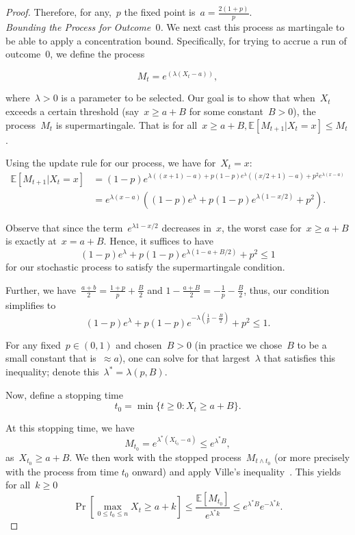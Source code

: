 \begin{proof}
Therefore, for any,~$p$ the fixed point is~$a = \frac{2(1+p)}{p}$.\\

\textit{Bounding the Process for Outcome~$0$.} 
We next cast this process as martingale to be able to apply a concentration bound. Specifically, for trying to accrue a run of outcome~$0$, we define the process

$$M_t = e^{(\lambda(X_t - a))},$$

where~$\lambda > 0$ is a parameter to be selected. Our goal is to show that when~$X_t$ exceeds a certain threshold (say~$x \geq a + B$ for some constant~$B > 0$), the process~$M_t$ is supermartingale. That is for all~$x \geq a + B, \mathbb{E}[M_{t+1} | X_t = x] \leq M_t$. 

Using the update rule for our process, we have for~$X_t = x$:
\begin{align*}
    \mathbb{E}[M_{t+1} | X_t = x] &= (1-p)e^{\lambda((x+1)-a) + p(1-p)e^{\lambda}((x/2+1)-a) + p^2e^{\lambda(x-a)}} \\
    &= e^{\lambda(x-a)} \left( (1-p)e^{\lambda} + p(1-p)e^{\lambda(1-x/2)}+p^2 \right).
\end{align*}

Observe that since the term~$e^{\lambda1-x/2}$ decreases in~$x$, the worst case for~$x \geq a+B$ is exactly at~$x=a+B$. Hence, it suffices to have
$$(1-p)e^{\lambda} + p(1-p)e^{\lambda(1-a+B/2)}+p^2 \leq 1$$
for our stochastic process to satisfy the supermartingale condition. 

Further, we have~$\frac{a+b}{2} = \frac{1+p}{p} + \frac{B}{2}$ and $1 - \frac{a+B}{2} = -\frac{1}{p} - \frac{B}{2}$, thus, our condition simplifies to
$$(1-p)e^{\lambda} + p(1-p)e^{-\lambda \left( \frac{1}{p} - \frac{B}{2} \right)} + p^2 \leq 1.$$

For any fixed~$p \in (0,1)$ and chosen~$B>0$ (in practice we chose~$B$ to be a small constant that is~$\approx a$), one can solve for that largest~$\lambda$ that satisfies this inequality; denote this~$\lambda^{*} = \lambda(p,B)$. 

Now, define a stopping time
$$t_0 = \min \{ t \geq 0 : X_t \geq a + B \}.$$

At this stopping time, we have 
$$M_{t_0} = e^{\lambda^{*}(X_{t_0} - a)} \leq e^{\lambda^{*}B},$$
as~$X_{t_{0}} \geq a+B$. We then work with the stopped process~$M_{t \land t_0}$ (or more precisely with the process from time $t_0$ onward) and apply Ville's inequality~\cite{ville1939etude}. This yields for all~$k \geq 0$
$$\Pr \left[ \underset{0 \leq t_0 \leq n}{\max} X_t \geq a + k \right] \leq \frac{\mathbb{E}[M_{t_0}]}{e^{\lambda^{*}k}} \leq e^{\lambda^{*}B}e^{-\lambda^{*}k}.$$


\end{proof}
